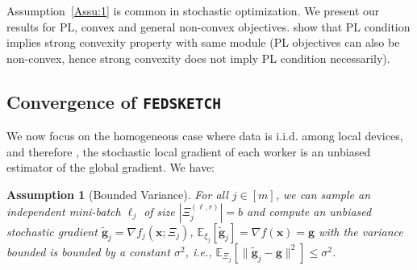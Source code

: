 \documentclass{article} %
\newtheorem{assumption}{Assumption}
\begin{document}
Assumption~\ref{Assu:1} is common in stochastic optimization. 
We present our results for PL, convex and general non-convex objectives. \citep{karimi2016linear} show that PL condition implies strong convexity property with same module (PL objectives can also be non-convex, hence strong convexity does not imply PL condition necessarily).

\vspace{-0.05in}
\subsection{Convergence of  \texttt{FEDSKETCH} } 
\vspace{-0.05in}
We now focus on the homogeneous case where data is i.i.d. among local devices, and therefore 
, the stochastic local gradient of each worker is an unbiased estimator of the global gradient.
We have:
\begin{assumption}[Bounded Variance]\label{Assu:1.5}
For all $j\in [m]$, we can sample an independent mini-batch $\ell_j$   of size $|\Xi_j^{(\ell,r)}| = b$ and compute an unbiased stochastic gradient  $\tilde{\mathbf{g}}_j = \nabla f_j(\boldsymbol{x}; \Xi_j)$, $\mathbb{E}_{\xi_j}[\tilde{\mathbf{g}}_j] = \nabla f(\boldsymbol{x})=\mathbf{g}$ with  the variance bounded is bounded by a constant $\sigma^2$, i.e., $
\mathbb{E}_{\Xi_j}\left[\|\tilde{\mathbf{g}}_j-\mathbf{g}\|^2\right]\leq \sigma^2$.
\end{assumption}
\end{document}
